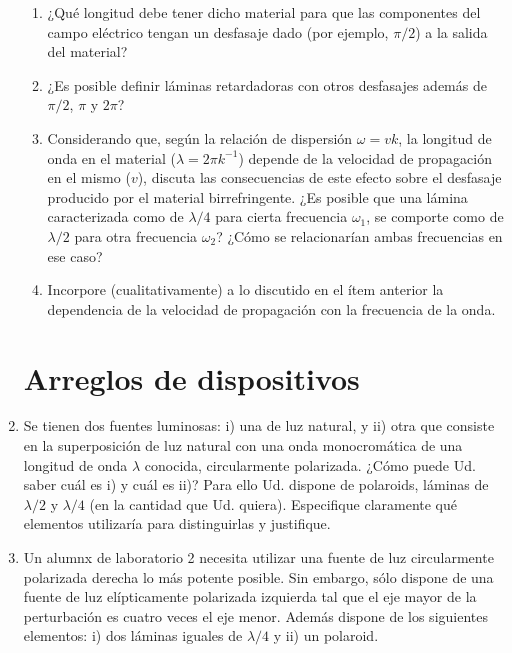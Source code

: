 \documentclass[11pt,spanish]{article}
\begin{document}
\begin{enumerate}
    \begin{enumerate}
        \item ¿Qué longitud debe tener dicho material para que las componentes
        del campo eléctrico tengan un desfasaje dado (por ejemplo, $\pi/2$) a la
        salida del material?
        
        \item ¿Es posible definir láminas retardadoras con otros desfasajes
        además de $\pi/2$, $\pi$ y $2\pi$?
        
        \item Considerando que, según la relación de dispersión $\omega = v k$,
        la longitud de onda en el material ($\lambda = 2\pi k^{-1}$) depende de
        la velocidad de propagación en el mismo ($v$), discuta las consecuencias
        de este efecto sobre el desfasaje producido por el material
        birrefringente. ¿Es posible que una lámina caracterizada como de
        $\lambda/4$ para cierta frecuencia $\omega_1$, se comporte como de
        $\lambda/2$ para otra frecuencia $\omega_2$? ¿Cómo se relacionarían
        ambas frecuencias en ese caso?
        
        \item Incorpore (cualitativamente) a lo discutido en el ítem anterior la
        dependencia de la velocidad de propagación con la frecuencia de la onda.
        
    \end{enumerate}


\section*{Arreglos de dispositivos}


    \item Se tienen dos fuentes luminosas: i) una de luz natural, y ii) otra
    que consiste en la superposición de luz natural con una onda monocromática
    de una longitud de onda $\lambda$ conocida, circularmente polarizada.
    ¿Cómo puede Ud. saber cuál es i) y cuál es ii)? Para ello Ud. dispone
    de polaroids, láminas de $\lambda/2$ y $\lambda/4$ (en la cantidad que Ud.
    quiera). Especifique claramente qué elementos utilizaría para
    distinguirlas y justifique.


    \item Un alumnx de laboratorio 2 necesita utilizar una fuente de luz
    circularmente polarizada derecha lo más potente posible. Sin embargo, sólo
    dispone de una fuente de luz elípticamente polarizada izquierda tal que el
    eje mayor de la perturbación es cuatro veces el eje menor. Además
    dispone de los siguientes elementos: i) dos láminas iguales de $\lambda/4$
    y ii) un polaroid.
    

\end{enumerate}
\end{document}
